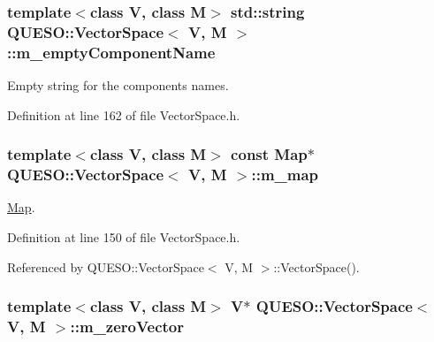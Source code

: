 \hypertarget{class_q_u_e_s_o_1_1_vector_space_a7cc6bfad9eb4031dbe763728f0c25a13}{
\subsubsection[{m\-\_\-empty\-Component\-Name}]{\setlength{\rightskip}{0pt plus 5cm}template$<$class V, class M$>$ std\-::string {\bf Q\-U\-E\-S\-O\-::\-Vector\-Space}$<$ V, M $>$\-::m\-\_\-empty\-Component\-Name\hspace{0.3cm}{\ttfamily [protected]}}}\label{class_q_u_e_s_o_1_1_vector_space_a7cc6bfad9eb4031dbe763728f0c25a13}


Empty string for the components names. 



Definition at line 162 of file Vector\-Space.\-h.

\hypertarget{class_q_u_e_s_o_1_1_vector_space_a752194a4dc937db4db4df2a3b207d3b9}{
\subsubsection[{m\-\_\-map}]{\setlength{\rightskip}{0pt plus 5cm}template$<$class V, class M$>$ const {\bf Map}$\ast$ {\bf Q\-U\-E\-S\-O\-::\-Vector\-Space}$<$ V, M $>$\-::m\-\_\-map\hspace{0.3cm}{\ttfamily [protected]}}}\label{class_q_u_e_s_o_1_1_vector_space_a752194a4dc937db4db4df2a3b207d3b9}


\hyperlink{class_q_u_e_s_o_1_1_map}{Map}. 



Definition at line 150 of file Vector\-Space.\-h.



Referenced by Q\-U\-E\-S\-O\-::\-Vector\-Space$<$ V, M $>$\-::\-Vector\-Space().

\hypertarget{class_q_u_e_s_o_1_1_vector_space_a0faa184316e08edb286a1bd0a5059b10}{
\subsubsection[{m\-\_\-zero\-Vector}]{\setlength{\rightskip}{0pt plus 5cm}template$<$class V, class M$>$ V$\ast$ {\bf Q\-U\-E\-S\-O\-::\-Vector\-Space}$<$ V, M $>$\-::m\-\_\-zero\-Vector\hspace{0.3cm}{\ttfamily [protected]}}}\label{class_q_u_e_s_o_1_1_vector_space_a0faa184316e08edb286a1bd0a5059b10}


